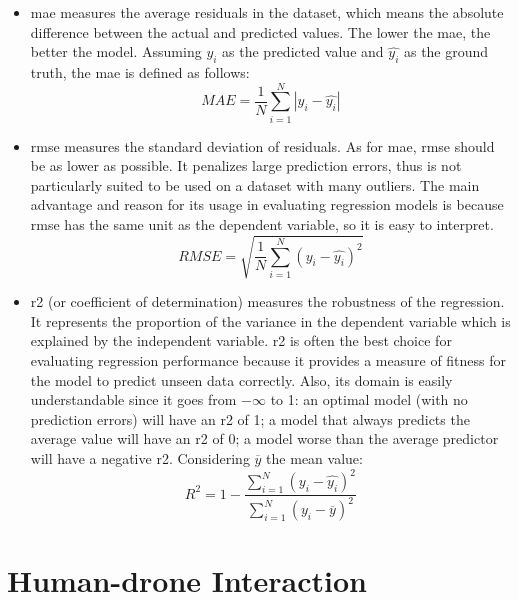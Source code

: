 \begin{itemize}
	\item \gls{mae} measures the average residuals in the dataset, which means the absolute difference between the actual and predicted values. The lower the \gls{mae}, the better the model. Assuming $y_i$ as the predicted value and $\hat{y_i}$ as the ground truth, the \gls{mae} is defined as follows:
	$$ MAE = \frac{1}{N} \sum_{i=1}^N |y_i - \hat{y_i}| $$
	
	\item \gls{rmse} measures the standard deviation of residuals. As for \gls{mae}, \gls{rmse} should be as lower as possible. It penalizes large prediction errors, thus is not particularly suited to be used on a dataset with many outliers. The main advantage and reason for its usage in evaluating regression models is because \gls{rmse} has the same unit as the dependent variable, so it is easy to interpret.
	$$ RMSE = \sqrt{\frac{1}{N} \sum_{i=1}^N (y_i - \hat{y_i})^2} $$
	
	\item \gls{r2} (or coefficient of determination) measures the robustness of the regression. It represents the proportion of the variance in the dependent variable which is explained by the independent variable. \gls{r2} is often the best choice for evaluating regression performance because it provides a measure of fitness for the model to predict unseen data correctly. Also, its domain is easily understandable since it goes from $-\infty$ to 1: an optimal model (with no prediction errors) will have an \gls{r2} of 1; a model that always predicts the average value will have an \gls{r2} of 0; a model worse than the average predictor will have a negative \gls{r2}. Considering $\overline{y}$ the mean value:
	$$ R^2 = 1 - \frac{\sum_{i=1}^N (y_i - \hat{y_i})^2}{\sum_{i=1}^N (y_i - \overline{y})^2} $$
\end{itemize}


%



\section{Human-drone Interaction}
\label{sec:human-drone-interaction}

